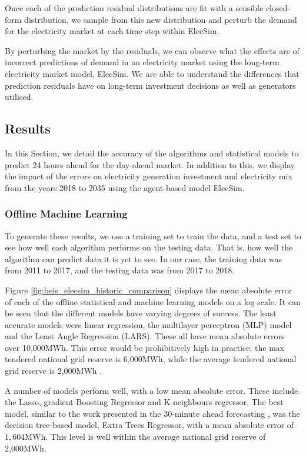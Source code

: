 Once each of the prediction residual distributions are fit with a sensible closed-form distribution, we sample from this new distribution and perturb the demand for the electricity market at each time step within ElecSim.

By perturbing the market by the residuals, we can observe what the effects are of incorrect predictions of demand in an electricity market using the long-term electricity market model, ElecSim. We are able to understand the differences that prediction residuals have on long-term investment decisions as well as generators utilised.




\subsection{Results}
\label{sec:results}

In this Section, we detail the accuracy of the algorithms and statistical models to predict 24 hours ahead for the day-ahead market. In addition to this, we display the impact of the errors on electricity generation investment and electricity mix from the years 2018 to 2035 using the agent-based model ElecSim.



\subsubsection{Offline Machine Learning}

To generate these results, we use a training set to train the data, and a test set to see how well each algorithm performs on the testing data. That is, how well the algorithm can predict data it is yet to see. In our case, the training data was from 2011 to 2017, and the testing data was from 2017 to 2018.

Figure \ref{fig:beis_elecsim_historic_comparison} displays the mean absolute error of each of the offline statistical and machine learning models on a log scale. It can be seen that the different models have varying degrees of success. The least accurate models were linear regression, the multilayer perceptron (MLP) model and the Least Angle Regression (LARS). These all have mean absolute errors over 10,000MWh. This error would be prohibitively high in practice; the max tendered national grid reserve is 6,000MWh, while the average tendered national grid reserve is 2,000MWh \cite{ESO2019}.

A number of models perform well, with a low mean absolute error. These include the Lasso, gradient Boosting Regressor and K-neighbours regressor. The best model, similar to the work presented in the 30-minute ahead forecasting  \cite{Kell2018a}, was the decision tree-based model, Extra Trees Regressor, with a mean absolute error of $1,604$MWh. This level is well within the average national grid reserve of 2,000MWh.



